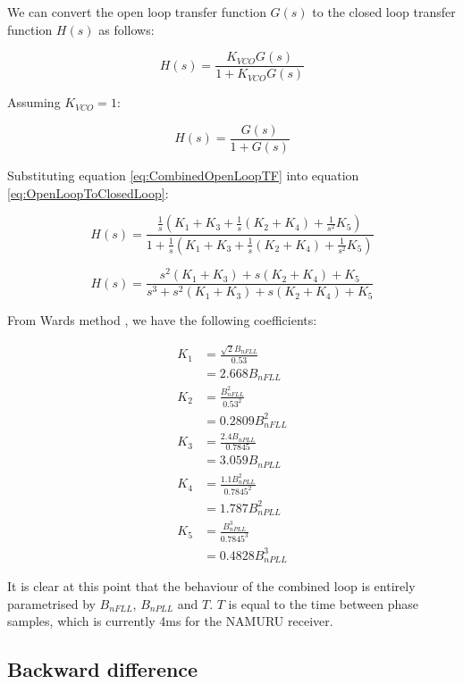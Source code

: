 We can convert the open loop transfer function $G(s)$ to the closed loop transfer function $H(s)$ as follows\cite{KazemiPHD,Gardner}:

\begin{equation}
 H(s) = \frac{K_{VCO}G(s)}{1+K_{VCO}G(s)}
\end{equation}

Assuming $K_{VCO}=1$:

\begin{equation}
 H(s) = \frac{G(s)}{1+G(s)}
\label{eq:OpenLoopToClosedLoop}
\end{equation}

Substituting equation \ref{eq:CombinedOpenLoopTF} into equation \ref{eq:OpenLoopToClosedLoop}:

\begin{equation}
 H(s) = \frac{\frac{1}{s} (K_1+K_3 + \frac{1}{s}(K_2+K_4) + \frac{1}{s^2} K_5)}{1+\frac{1}{s} (K_1+K_3 + \frac{1}{s}(K_2+K_4) + \frac{1}{s^2} K_5)}
\end{equation}

\begin{equation}
 H(s) = \frac{s^2(K_1+K_3) + s(K_2+K_4) + K_5}
 {s^3+ s^2(K_1+K_3)+ s(K_2+K_4) + K_5}
\end{equation}
\clearpage


From Wards method \cite{Ward}, we have the following coefficients:

\begin{align*}
K_1 &=\frac{\sqrt{2}B_{nFLL}}{0.53}\\
    &= 2.668 B_{nFLL}\\
K_2 &=\frac{B_{nFLL}^2}{0.53^2}\\
    &= 0.2809 B_{nFLL}^2\\
K_3 &=\frac{2.4B_{nPLL}}{0.7845}\\ 
    &=3.059 B_{nPLL}\\
K_4 &=\frac{1.1B_{nPLL}^2}{0.7845^2}\\
    &=1.787 B_{nPLL}^2\\
K_5 &=\frac{B_{nPLL}^3}{0.7845^3}\\
    &=0.4828B_{nPLL}^3
\end{align*}

It is clear at this point that the behaviour of the combined loop is entirely parametrised by $B_{nFLL}$,  $B_{nPLL}$ and $T$. $T$ is equal to the time between phase samples, which is currently 4ms for the \ac{NAMURU} receiver.

\subsection{Backward difference}

